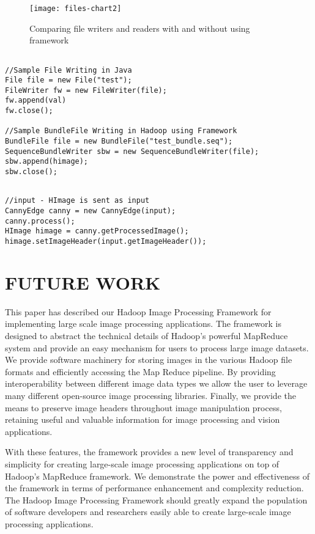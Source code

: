 \begin{figure}[h]
	\centering
	\texttt{[image: files-chart2]}
	\caption{Comparing file writers and readers with and without using
		framework}
	\label{fig:files-chart}
\end{figure}
\newpage
\begin{lstlisting}[caption = Comparing FileWriter instance in java and SequenceBundleWriter instance in Hadoop Image Processing framework ]

//Sample File Writing in Java
File file = new File("test");
FileWriter fw = new FileWriter(file);
fw.append(val)
fw.close();

//Sample BundleFile Writing in Hadoop using Framework
BundleFile file = new BundleFile("test_bundle.seq");
SequenceBundleWriter sbw = new SequenceBundleWriter(file);
sbw.append(himage);
sbw.close();
\end{lstlisting}

\begin{lstlisting}[caption = Setting image headers for processed images using Hadoop Image Processing Framework]

//input - HImage is sent as input 
CannyEdge canny = new CannyEdge(input);
canny.process();
HImage himage = canny.getProcessedImage();
himage.setImageHeader(input.getImageHeader());

\end{lstlisting}

\chapter{FUTURE WORK}
This paper has described our Hadoop Image Processing Framework for
implementing large scale image processing applications.  The framework
is designed to abstract the technical details of Hadoop's powerful
MapReduce system and provide an easy mechanism for users to process
large image datasets. We provide software machinery for storing images
in the various Hadoop file formats and efficiently accessing the Map
Reduce pipeline.  By providing interoperability between different
image data types we allow the user to leverage many different
open-source image processing libraries. Finally, we provide the means
to preserve image headers throughout image manipulation process,
retaining useful and valuable information for image processing and
vision applications.

With these features, the framework provides a new level of
transparency and simplicity for creating large-scale image processing
applications on top of Hadoop's MapReduce framework.  We demonstrate
the power and effectiveness of the framework in terms of performance
enhancement and complexity reduction.  The Hadoop Image Processing
Framework should greatly expand the population of software developers
and researchers easily able to create large-scale image processing
applications.

